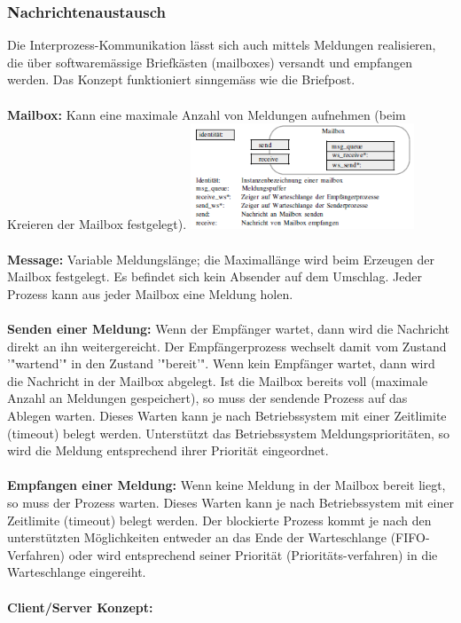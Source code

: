 \subsubsection{Nachrichtenaustausch}
Die Interprozess-Kommunikation lässt sich auch mittels Meldungen realisieren, die über softwaremässige Briefkästen (mailboxes) versandt und empfangen werden. Das Konzept funktioniert sinngemäss wie die Briefpost.\\\\
\textbf{Mailbox:} Kann eine maximale Anzahl von Meldungen aufnehmen (beim Kreieren
der Mailbox festgelegt).
\includegraphics[width=0.5\textwidth]{images/Betriebssysteme/Mailbox.png}\\\\
\textbf{Message:} Variable Meldungslänge; die Maximallänge wird beim Erzeugen der Mailbox
festgelegt. Es befindet sich kein Absender auf dem Umschlag. Jeder Prozess kann aus jeder Mailbox eine Meldung holen.\\\\
\textbf{Senden einer Meldung:}
Wenn der Empfänger wartet, dann wird die Nachricht direkt an ihn weitergereicht. Der Empfängerprozess wechselt damit vom Zustand '"wartend'" in den Zustand '"bereit'". Wenn kein Empfänger wartet, dann wird die Nachricht in der Mailbox abgelegt. Ist die Mailbox bereits voll (maximale Anzahl an Meldungen gespeichert),
so muss der sendende Prozess auf das Ablegen warten. Dieses Warten kann je nach Betriebssystem mit einer Zeitlimite (timeout) belegt werden. Unterstützt das Betriebssystem Meldungsprioritäten, so wird die Meldung
entsprechend ihrer Priorität eingeordnet.\\\\
\textbf{Empfangen einer Meldung:} Wenn keine Meldung in der Mailbox bereit liegt, so muss der Prozess warten. Dieses Warten kann je nach Betriebssystem mit einer Zeitlimite (timeout) belegt werden. Der blockierte Prozess kommt je nach den unterstützten Möglichkeiten entweder an das Ende der Warteschlange (FIFO-Verfahren) oder wird entsprechend seiner Priorität (Prioritäts-verfahren) in die Warteschlange eingereiht.\\\\
\textbf{Client/Server Konzept:} 
